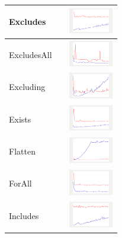\begin{longtable}{ m{2.5cm} m{8cm} m{2cm} }
Excludes &

&
\includegraphics[width=2cm]{../graphs/set/small/Excludes}
\\\hline

ExcludesAll &

&
\includegraphics[width=2cm]{../graphs/set/small/ExcludesAll}
\\\hline

Excluding &

&
\includegraphics[width=2cm]{../graphs/set/small/Excluding}
\\\hline

Exists &

&
\includegraphics[width=2cm]{../graphs/set/small/Exists}
\\\hline

Flatten &

&
\includegraphics[width=2cm]{../graphs/set/small/Flatten}
\\\hline

ForAll &

&
\includegraphics[width=2cm]{../graphs/set/small/forALL}
\\\hline

Includes &

&
\includegraphics[width=2cm]{../graphs/set/small/Includes}
\\\hline


\end{longtable}
